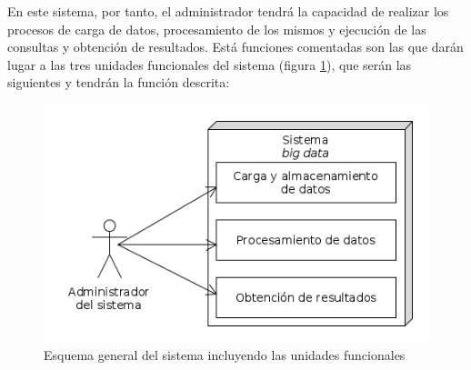 En este sistema, por tanto, el administrador tendrá la capacidad de realizar los procesos de carga de datos, procesamiento de los mismos y ejecución de las consultas y obtención de resultados. Está funciones comentadas son las que darán lugar a las tres unidades funcionales del sistema (figura \ref{fig:esquemagen}), que serán las siguientes y tendrán la función descrita:

\begin{figure}[htp!]
\centering
\caption{Esquema general del sistema incluyendo las unidades funcionales}
\label{fig:esquemagen}
\includegraphics[scale=0.7]{diagramas/esquemaGen}
\end{figure}

